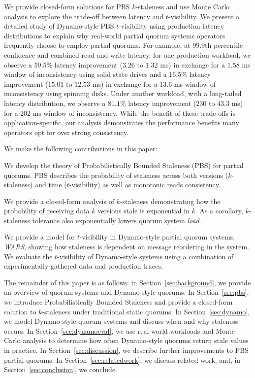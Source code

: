 \documentclass{vldb}
\begin{document}
We provide closed-form solutions for PBS $k$-staleness and use Monte
Carlo analysis to explore the trade-off between latency and
$t$-visibility.  We present a detailed study of Dynamo-style PBS
$t$-visibility using production latency distributions to explain why
real-world partial quorum systems operators frequently choose to
employ partial quorums. For example, at $99.9$th percentile confidence
and combined read and write latency, for one production workload, we
observe a $59.5\%$ latency improvement ($3.26$ to $1.32$ ms) in
exchange for a $1.58$ ms window of inconsistency using solid state
drives and a $16.5\%$ latency improvement ($15.01$ to $12.53$ ms) in
exchange for a $13.6$ ms window of inconsistency using spinning disks.
Under another workload, with a long-tailed latency distribution, we
observe a $81.1\%$ latency improvement ($230$ to $43.3$ ms) for a
$202$ ms window of inconsistency.  While the benefit of these
trade-offs is application-specific, our analysis demonstrates the
performance benefits many operators opt for over strong consistency.

We make the following contributions in this paper:

\begin{itemize*}

\item We develop the theory of Probabilistically Bounded Staleness
  (PBS) for partial quorums. PBS describes the probability of
  staleness across both versions ($k$-staleness) and time
  ($t$-visibility) as well as monotonic reads consistency.

\item We provide a closed-form analysis of $k$-staleness demonstrating
  how the probability of receiving data $k$ versions stale is
  exponential in $k$.  As a corollary, $k$-staleness tolerance also
  exponentially lowers quorum system \textit{load}.

\item We provide a model for $t$-visibility in
  Dynamo-style partial quorum systems, \textit{WARS},  showing how
  staleness is dependent on message reordering in the system.  We
  evaluate the $t$-visibility of Dynamo-style systems using a
  combination of experimentally-gathered data and production traces.

\end{itemize*}

The remainder of this paper is as follows: in
Section~\ref{sec:background}, we provide an overview of quorum systems
and Dynamo-style quorums.  In Section~\ref{sec:pbs}, we introduce
Probabilistically Bounded Staleness and provide a closed-form solution
to $k$-staleness under traditional static quorums.  In
Section~\ref{sec:dynamo}, we model Dynamo-style quorum systems and
discuss when and why staleness occurs.  In Section~\ref{sec:dynamoeval}, we
use real-world workloads and Monte Carlo analysis to determine how
often Dynamo-style quorums return stale values in practice.  In
Section~\ref{sec:discussion}, we describe further improvements to
PBS partial quorums. In Section~\ref{sec:relatedwork}, we discuss
related work, and, in Section~\ref{sec:conclusion}, we conclude.
\end{document}
